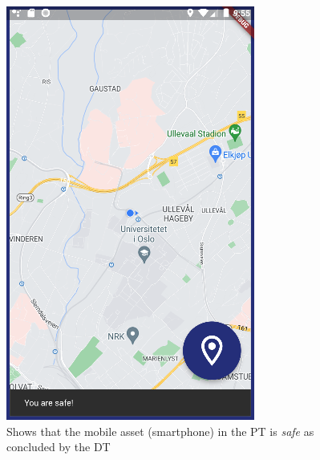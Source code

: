 \documentclass{article}
\begin{document}
\begin{figure}[H]
    \centering
    \begin{minipage}[c]{0.40\linewidth}
        \includegraphics[width=\linewidth]{graphics/safe_smartphone.png}
        \caption{Shows that the mobile asset (smartphone) in the PT is \emph{safe} as concluded by the DT}
        \label{fig:safe_smartphone}
    \end{minipage}
    \hfill
    \begin{minipage}[c]{0.40\linewidth}

\end{minipage}
\end{figure}
\end{document}
